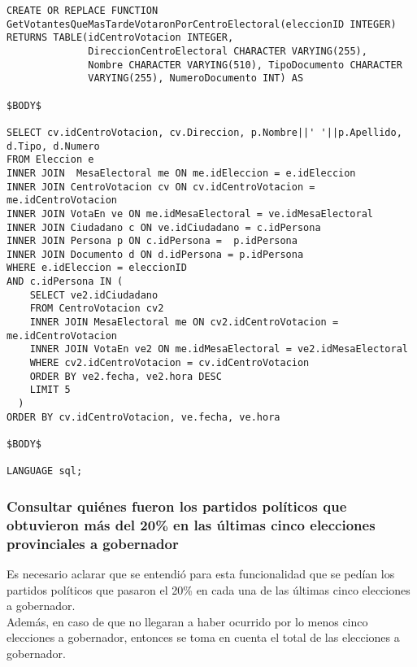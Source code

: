 \begin{verbatim}
CREATE OR REPLACE FUNCTION GetVotantesQueMasTardeVotaronPorCentroElectoral(eleccionID INTEGER)
RETURNS TABLE(idCentroVotacion INTEGER,
              DireccionCentroElectoral CHARACTER VARYING(255),
              Nombre CHARACTER VARYING(510), TipoDocumento CHARACTER
              VARYING(255), NumeroDocumento INT) AS

$BODY$

SELECT cv.idCentroVotacion, cv.Direccion, p.Nombre||' '||p.Apellido, d.Tipo, d.Numero 
FROM Eleccion e
INNER JOIN  MesaElectoral me ON me.idEleccion = e.idEleccion
INNER JOIN CentroVotacion cv ON cv.idCentroVotacion = me.idCentroVotacion
INNER JOIN VotaEn ve ON me.idMesaElectoral = ve.idMesaElectoral
INNER JOIN Ciudadano c ON ve.idCiudadano = c.idPersona
INNER JOIN Persona p ON c.idPersona =  p.idPersona
INNER JOIN Documento d ON d.idPersona = p.idPersona
WHERE e.idEleccion = eleccionID
AND c.idPersona IN (
    SELECT ve2.idCiudadano
    FROM CentroVotacion cv2
    INNER JOIN MesaElectoral me ON cv2.idCentroVotacion = me.idCentroVotacion
    INNER JOIN VotaEn ve2 ON me.idMesaElectoral = ve2.idMesaElectoral
    WHERE cv2.idCentroVotacion = cv.idCentroVotacion
    ORDER BY ve2.fecha, ve2.hora DESC
    LIMIT 5
  )
ORDER BY cv.idCentroVotacion, ve.fecha, ve.hora

$BODY$

LANGUAGE sql;

\end{verbatim}

\subsubsection{Consultar quiénes fueron los partidos políticos que obtuvieron más del 20\% en las últimas cinco elecciones provinciales a gobernador}

\indent \indent Es necesario aclarar que se entendió para esta funcionalidad que se pedían los partidos políticos que pasaron el 20\% en cada una de las últimas cinco elecciones a gobernador.\\
\indent Además, en caso de que no llegaran a haber ocurrido por lo menos cinco elecciones a gobernador, entonces se toma en cuenta el total de las elecciones a gobernador.\\


